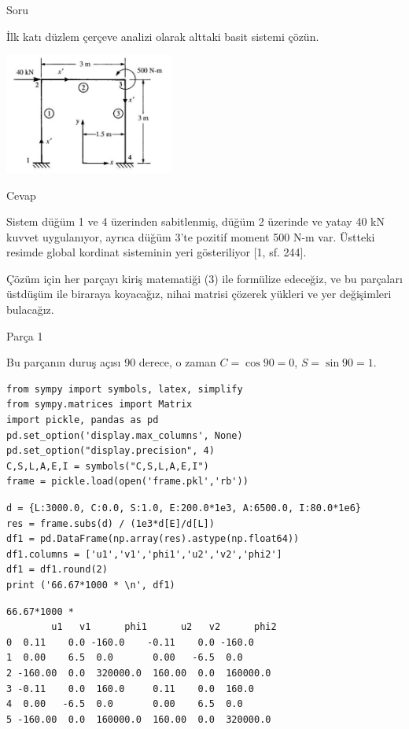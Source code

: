 \documentclass[12pt,fleqn]{article}\usepackage{../../common}
\begin{document}
Soru

İlk katı düzlem çerçeve analizi olarak alttaki basit sistemi çözün.

\includegraphics[width=15em]{phy_020_strs_06_03.jpg}

Cevap

Sistem düğüm 1 ve 4 üzerinden sabitlenmiş, düğüm 2 üzerinde ve yatay 40 kN
kuvvet uygulanıyor, ayrıca düğüm 3'te pozitif moment 500 N-m var. Üstteki
resimde global kordinat sisteminin yeri gösteriliyor [1, sf. 244].

Çözüm için her parçayı kiriş matematiği (3) ile formülize edeceğiz, ve bu
parçaları üstdüşüm ile biraraya koyacağız, nihai matrisi çözerek yükleri ve yer
değişimleri bulacağız.

Parça 1

Bu parçanın duruş açısı 90 derece, o zaman $C = \cos 90 = 0$, $S = \sin 90 = 1$.

\begin{verbatim}
from sympy import symbols, latex, simplify
from sympy.matrices import Matrix
import pickle, pandas as pd
pd.set_option('display.max_columns', None)
pd.set_option("display.precision", 4)
C,S,L,A,E,I = symbols("C,S,L,A,E,I")
frame = pickle.load(open('frame.pkl','rb'))
\end{verbatim}

\begin{verbatim}
d = {L:3000.0, C:0.0, S:1.0, E:200.0*1e3, A:6500.0, I:80.0*1e6}
res = frame.subs(d) / (1e3*d[E]/d[L])
df1 = pd.DataFrame(np.array(res).astype(np.float64))
df1.columns = ['u1','v1','phi1','u2','v2','phi2']
df1 = df1.round(2)
print ('66.67*1000 * \n', df1)
\end{verbatim}

\begin{verbatim}
66.67*1000 * 
        u1   v1      phi1      u2   v2      phi2
0  0.11    0.0 -160.0    -0.11    0.0 -160.0   
1  0.00    6.5  0.0       0.00   -6.5  0.0     
2 -160.00  0.0  320000.0  160.00  0.0  160000.0
3 -0.11    0.0  160.0     0.11    0.0  160.0   
4  0.00   -6.5  0.0       0.00    6.5  0.0     
5 -160.00  0.0  160000.0  160.00  0.0  320000.0
\end{verbatim}
\end{document}
